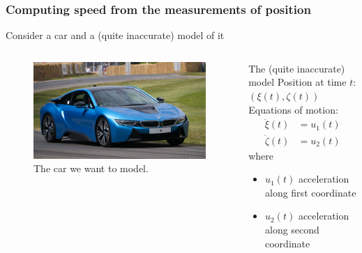 \begin{frame} 
	\frametitle{Computing speed from the measurements of position} 
	Consider a car and a (quite inaccurate) model of it
	\begin{columns}[onlytextwidth]
		\begin{figure}[h]
			\includegraphics[width=\textwidth]{fig/auto_real}%
			\caption*{The car we want to model.\footnotemark} 
		\end{figure}
		\begin{block}{The (quite inaccurate) model}
		Position at time $t$: $(\xi(t), \zeta(t))$ \\%
		Equations of motion:
		\begin{align*}
		  \ddot{\xi}(t)& = u_1(t) \\
		  \ddot{\zeta}(t)& = u_2(t)
		\end{align*}
		where 
		\begin{itemize}
			\item $u_1(t)$ acceleration along first coordinate\\%
			\item $u_2(t)$ acceleration along second coordinate\\%
		\end{itemize}
		\end{block}
	\end{columns}
	
	
\end{frame}

